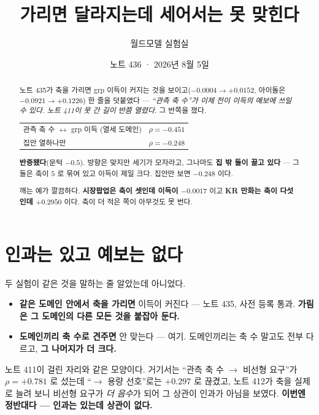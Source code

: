 \documentclass[11pt]{article}
\begin{document}
\title{가리면 달라지는데 세어서는 못 맞힌다}
\author{월드모델 실험실}
\date{노트 436 · 2026년 8월 5일}
\maketitle

\begin{abstract}
노트 435가 축을 가리면 grp 이득이 커지는 것을 보이고($-0.0004 \to +0.0152$,
아이돌은 $-0.0921 \to +0.1226$) 한 줄을 덧붙였다 --- \emph{``관측 축 수''가
이제 전이 이득의 예보에 쓰일 수 있다. 노트 411이 못 간 길이 반쯤 열렸다.}
그 반쪽을 쟀다.

\begin{center}
\begin{tabular}{lr}
\hline
관측 축 수 $\leftrightarrow$ grp 이득 (열세 도메인) & $\rho = \mathbf{-0.451}$ \\
집안 열하나만 & $\rho = -0.248$ \\
\hline
\end{tabular}
\end{center}

\textbf{반증됐다}(문턱 $-0.5$). 방향은 맞지만 세기가 모자라고, 그나마도
\textbf{집 밖 둘이 끌고 있다} --- 그 둘은 축이 $5$ 로 묶여 있고 이득이 제일
크다. 집안만 보면 $-0.248$ 이다.

깨는 예가 깔끔하다. \textbf{시장팝업은 축이 셋인데 이득이 $-0.0017$} 이고
\textbf{KR 만화는 축이 다섯인데 $+0.2950$} 이다. 축이 더 적은 쪽이 아무것도
못 번다.
\end{abstract}

\section{인과는 있고 예보는 없다}

두 실험이 같은 것을 말하는 줄 알았는데 아니었다.

\begin{itemize}
\item \textbf{같은 도메인 안에서 축을 가리면} 이득이 커진다 --- 노트 435,
사전 등록 통과. \textbf{가림은 그 도메인의 다른 모든 것을 붙잡아 둔다.}
\item \textbf{도메인끼리 축 수로 견주면} 안 맞는다 --- 여기. 도메인끼리는
축 수 말고도 전부 다르고, \textbf{그 나머지가 더 크다.}
\end{itemize}

노트 411이 걸린 자리와 같은 모양이다. 거기서는 ``관측 축 수 $\to$ 비선형
요구''가 $\rho = +0.781$ 로 섰는데 ``$\to$ 용량 선호''로는 $+0.297$ 로
끊겼고, 노트 412가 축을 실제로 늘려 보니 비선형 요구가 \emph{더 음수}가 되어
그 상관이 인과가 아님을 보였다. \textbf{이번엔 정반대다 --- 인과는 있는데
상관이 없다.}
\end{document}
